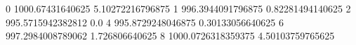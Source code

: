0 1000.67431640625 5.10272216796875
1 996.3944091796875 0.82281494140625
2 995.5715942382812 0.0
4 995.8729248046875 0.30133056640625
6 997.2984008789062 1.726806640625
8 1000.0726318359375 4.50103759765625
